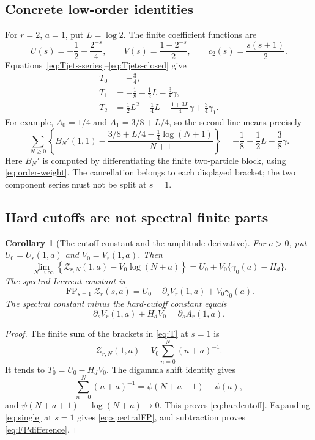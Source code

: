 \documentclass[11pt,letterpaper]{article}
\numberwithin{equation}{section}
\newtheorem{corollary}[theorem]{Corollary}
\theoremstyle{definition}\newtheorem{definition}[theorem]{Definition}
\theoremstyle{remark}\newtheorem{remark}[theorem]{Remark}
\DeclareMathOperator{\FP}{FP}
\newcommand{\Z}{\mathcal Z}\newcommand{\Bell}{\mathcal B}
\begin{document}
\subsection{Concrete low-order identities}
For $r=2$, $a=1$, put $L=\log2$. The finite coefficient functions are
\[
 U(s)=-\frac12+\frac{2^{-s}}4,\qquad
 V(s)=\frac{1-2^{-s}}2,\qquad c_2(s)=\frac{s(s+1)}2.
\]
Equations~\eqref{eq:Tjets-series}--\eqref{eq:Tjets-closed} give
\begin{align}
 T_0&=-\frac34,\label{eq:T0example}\\
 T_1&=-\frac18-\frac12L-\frac38\gamma,\label{eq:T1example}\\
 T_2&=\frac12L^2-\frac14L-\frac{1+3L}{4}\gamma
          +\frac34\gamma_1.\label{eq:T2example}
\end{align}
For example, $A_0=1/4$ and $A_1=3/8+L/4$, so the second line means
precisely
\begin{equation}\label{eq:T1seriesexample}
 \sum_{N\ge0}\left\{B_N'(1,1)
 -\frac{3/8+L/4-\tfrac14\log(N+1)}{N+1}\right\}
       =-\frac18-\frac12L-\frac38\gamma.
\end{equation}
Here $B_N'$ is computed by differentiating the finite two-particle block,
using \eqref{eq:order-weight}. The cancellation belongs to each displayed
bracket; the two component series must not be split at $s=1$.

\subsection{Hard cutoffs are not spectral finite parts}
\begin{corollary}[The cutoff constant and the amplitude derivative]
\label{cor:cutoff}
For $a>0$, put $U_0=U_r(1,a)$ and $V_0=V_r(1,a)$. Then
\begin{equation}\label{eq:hardcutoff}
 \lim_{N\to\infty}\left\{\Z_{r,N}(1,a)-V_0\log(N+a)\right\}
       =U_0+V_0\{\gamma_0(a)-H_d\}.
\end{equation}
The spectral Laurent constant is
\begin{equation}\label{eq:spectralFP}
 \FP_{s=1}\Z_r(s,a)=U_0+\partial_sV_r(1,a)+V_0\gamma_0(a).
\end{equation}
The spectral constant minus the hard-cutoff constant equals
\begin{equation}\label{eq:FPdifference}
 \partial_sV_r(1,a)+H_dV_0=\partial_sA_r(1,a).
\end{equation}
\end{corollary}
\begin{proof}
The finite sum of the brackets in \eqref{eq:T} at $s=1$ is
\[
 \Z_{r,N}(1,a)-V_0\sum_{n=0}^N(n+a)^{-1}.
\]
It tends to $T_0=U_0-H_dV_0$. The digamma shift identity gives
\[
 \sum_{n=0}^N(n+a)^{-1}=\psi(N+a+1)-\psi(a),
\]
and $\psi(N+a+1)-\log(N+a)\to0$. This proves
\eqref{eq:hardcutoff}. Expanding \eqref{eq:single} at $s=1$ gives
\eqref{eq:spectralFP}, and subtraction proves \eqref{eq:FPdifference}.
\end{proof}
\end{document}
